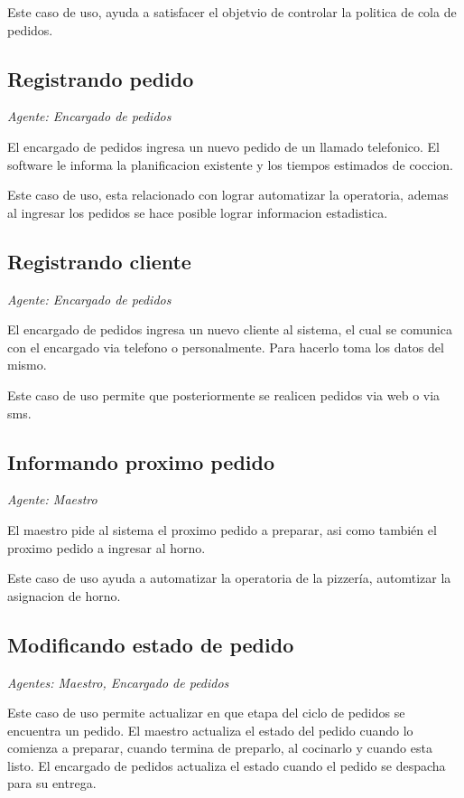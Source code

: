 Este caso de uso, ayuda a satisfacer el objetvio de controlar la politica de cola de pedidos.

\subsection{Registrando pedido}

\textit{Agente: Encargado de pedidos}

El encargado de pedidos ingresa un nuevo pedido de un llamado telefonico. El software le 
informa la planificacion existente y los tiempos estimados de coccion. %

Este caso de uso, esta relacionado con lograr automatizar la operatoria, ademas al ingresar 
los pedidos se hace posible lograr informacion estadistica.

\subsection{Registrando cliente}
\textit{Agente: Encargado de pedidos}

El encargado de pedidos ingresa un nuevo cliente al sistema, el cual se comunica con el 
encargado via telefono o personalmente. Para hacerlo toma los datos del mismo.

Este caso de uso permite que posteriormente se realicen pedidos via web o via sms.

\subsection{Informando proximo pedido}

\textit{Agente: Maestro}

El maestro pide al sistema el proximo pedido a preparar, asi como también el proximo pedido 
a ingresar al horno.

Este caso de uso ayuda a automatizar la operatoria de la pizzería, automtizar la asignacion 
de horno.

\subsection{Modificando estado de pedido} %
\textit{Agentes: Maestro, Encargado de pedidos}

Este caso de uso permite actualizar en que etapa del ciclo de pedidos se encuentra un 
pedido. El maestro actualiza el estado del pedido cuando lo comienza a preparar, cuando 
termina de preparlo, al cocinarlo y cuando esta listo. El encargado de pedidos actualiza el 
estado cuando el pedido se despacha para su entrega.

